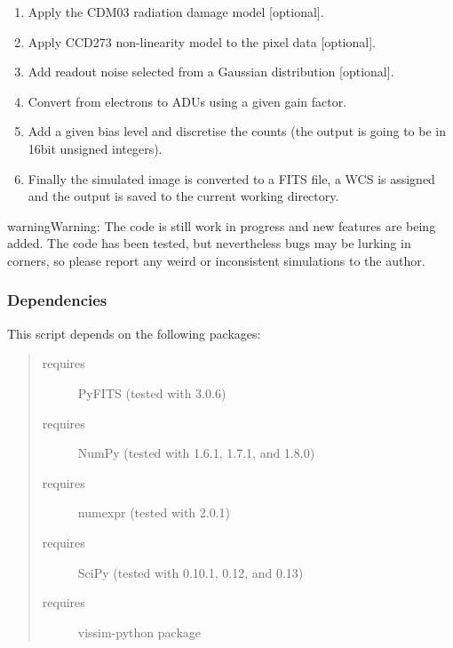 \documentclass[a4paper,11pt,english]{sphinxmanual}
\begin{document}
\begin{enumerate}
\item {} 
Apply the CDM03 radiation damage model {[}optional{]}.

\item {} 
Apply CCD273 non-linearity model to the pixel data {[}optional{]}.

\item {} 
Add readout noise selected from a Gaussian distribution {[}optional{]}.

\item {} 
Convert from electrons to ADUs using a given gain factor.

\item {} 
Add a given bias level and discretise the counts (the output is going to be in 16bit unsigned integers).

\item {} 
Finally the simulated image is converted to a FITS file, a WCS is assigned
and the output is saved to the current working directory.

\end{enumerate}

\begin{notice}{warning}{Warning:}
The code is still work in progress and new features are being added.
The code has been tested, but nevertheless bugs may be lurking in corners, so
please report any weird or inconsistent simulations to the author.
\end{notice}


\subsubsection{Dependencies}
\label{simulator:dependencies}
This script depends on the following packages:
\begin{quote}\begin{description}
\item[{requires}] \leavevmode
PyFITS (tested with 3.0.6)

\item[{requires}] \leavevmode
NumPy (tested with 1.6.1, 1.7.1, and 1.8.0)

\item[{requires}] \leavevmode
numexpr (tested with 2.0.1)

\item[{requires}] \leavevmode
SciPy (tested with 0.10.1, 0.12, and 0.13)

\item[{requires}] \leavevmode
vissim-python package

\end{description}\end{quote}
\end{document}
